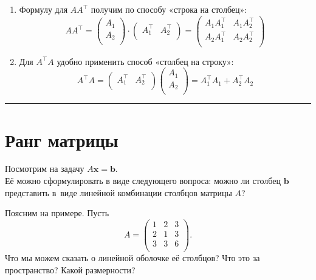 \documentclass[11pt,a4paper]{article}
\providecommand{\tightlist}{%
      \setlength{\itemsep}{0pt}\setlength{\parskip}{0pt}}
\begin{document}
\begin{enumerate}
\def\labelenumi{\arabic{enumi}.}
\tightlist
\item
  Формулу для \(A A^\top\) получим по способу «строка на столбец»: \[
    A A^\top = 
    \begin{pmatrix}
   A_1 \\
   A_2 \\
    \end{pmatrix}
    \cdot
    \begin{pmatrix}
   A_1^\top & A_2^\top \\
    \end{pmatrix}
    =
    \begin{pmatrix}
   A_1 A_1^\top & A_1 A_2^\top \\
   A_2 A_1^\top & A_2 A_2^\top \\
    \end{pmatrix}
  \]
\item
  Для \(A^\top A\) удобно применить способ «столбец на строку»: \[
    A^\top A =
    \begin{pmatrix}
   A_1^\top & A_2^\top \\
    \end{pmatrix}
    \begin{pmatrix}
   A_1 \\
   A_2 \\
    \end{pmatrix}
    = A_1^\top A_1 + A_2^\top A_2
  \]
\end{enumerate}

    \begin{center}\rule{0.5\linewidth}{0.5pt}\end{center}

    \hypertarget{ux440ux430ux43dux433-ux43cux430ux442ux440ux438ux446ux44b}{%
\section{Ранг
матрицы}\label{ux440ux430ux43dux433-ux43cux430ux442ux440ux438ux446ux44b}}

Посмотрим на задачу \(A \mathbf{x} = \mathbf{b}\).\\
Её можно сформулировать в виде следующего вопроса: можно ли столбец \(\mathbf{b}\) представить в~виде линейной комбинации столбцов матрицы
\(A\)?

Поясним на примере. Пусть \[
  A = 
  \begin{pmatrix}
     1 & 2 & 3 \\
     2 & 1 & 3 \\
     3 & 3 & 6 \\
  \end{pmatrix}.
\] Что мы можем сказать о линейной оболочке её столбцов? Что это за
пространство? Какой размерности?
\end{document}
